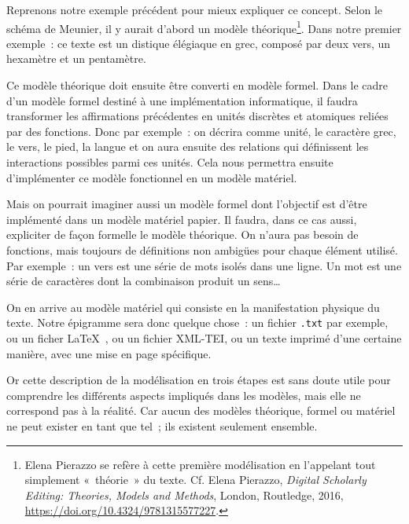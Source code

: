 Reprenons notre exemple précédent pour mieux expliquer ce concept. Selon
le schéma de Meunier, il y aurait d'abord un modèle
théorique\footnote{Elena Pierazzo se refère à cette première
  modélisation en l'appelant tout simplement «~théorie~» du texte. Cf.
  Elena Pierazzo, \emph{Digital {Scholarly} {Editing}: {Theories},
  {Models} and {Methods}}, London, Routledge, 2016,
  \url{https://doi.org/10.4324/9781315577227}.}. Dans notre premier
exemple~: ce texte est un distique élégiaque en grec, composé par deux
vers, un hexamètre et un pentamètre.

Ce modèle théorique doit ensuite être converti en modèle formel. Dans le
cadre d'un modèle formel destiné à une implémentation informatique, il
faudra transformer les affirmations précédentes en unités discrètes et
atomiques reliées par des fonctions. Donc par exemple~: on décrira comme
unité, le caractère grec, le vers, le pied, la langue et on aura ensuite
des relations qui définissent les interactions possibles parmi ces
unités. Cela nous permettra ensuite d'implémenter ce modèle fonctionnel
en un modèle matériel.

Mais on pourrait imaginer aussi un modèle formel dont l'objectif est
d'être implémenté dans un modèle matériel papier. Il faudra, dans ce cas
aussi, expliciter de façon formelle le modèle théorique. On n'aura pas
besoin de fonctions, mais toujours de définitions non ambigües pour
chaque élément utilisé. Par exemple~: un vers est une série de mots
isolés dans une ligne. Un mot est une série de caractères dont la
combinaison produit un sens\ldots{}

On en arrive au modèle matériel qui consiste en la manifestation
physique du texte. Notre épigramme sera donc quelque chose~: un fichier
\texttt{.txt} par exemple, ou un ficher \LaTeX~, ou un fichier XML-TEI,
ou un texte imprimé d'une certaine manière, avec une mise en page
spécifique.

Or cette description de la modélisation en trois étapes est sans doute
utile pour comprendre les différents aspects impliqués dans les modèles,
mais elle ne correspond pas à la réalité. Car aucun des modèles
théorique, formel ou matériel ne peut exister en tant que tel~; ils
existent seulement ensemble.

